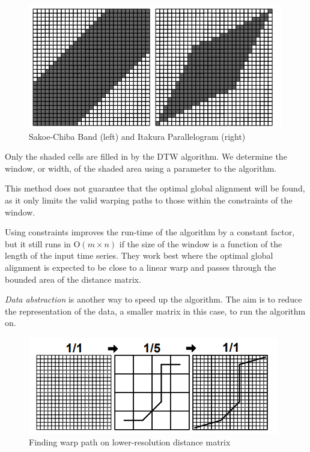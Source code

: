 \documentclass[final,rdr32.tex]{subfiles}
\begin{document}
\begin{figure}[H]
    \begin{center}
        \includegraphics[scale=1]{images/constraint.png}
        \caption{Sakoe-Chiba Band (left) and Itakura Parallelogram (right)}
    \end{center}
\end{figure}

Only the shaded cells are filled in by the DTW algorithm. We determine the window, or width, of the shaded area using a parameter to the algorithm.

This method does not guarantee that the optimal global alignment will be found, as it only limits the valid warping paths to those within the constraints of the window.

Using constraints improves the run-time of the algorithm by a constant factor, but it still runs in O$(m \times n)$ if the size of the window is a function of the length of the input time series. They work best where the optimal global alignment is expected to be close to a linear warp and passes through the bounded area of the distance matrix.


\textit{Data abstraction} \cite{chu2002iterative} is another way to speed up the algorithm. The aim is to reduce the representation of the data, a smaller matrix in this case, to run the algorithm on.

\begin{figure}[H]
    \begin{center}
        \includegraphics[scale=1]{images/data_abstraction.png}
        \caption{Finding warp path on lower-resolution distance matrix}
    \end{center}
\end{figure}
\end{document}
